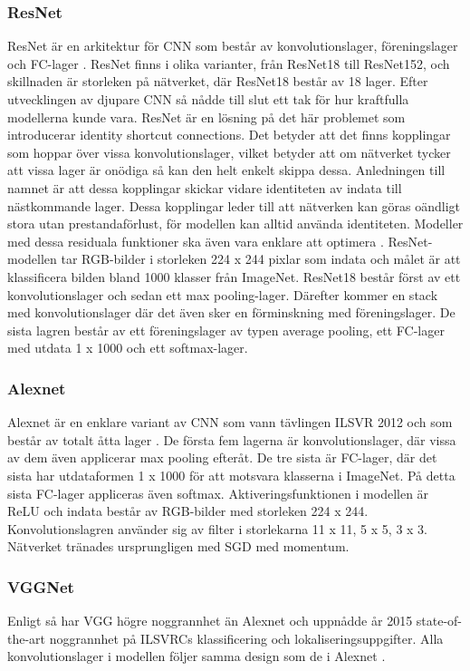 \documentclass[]{kththesis}
\begin{document}
\subsubsection{ResNet}
ResNet är en arkitektur för CNN som består av konvolutionslager, förenings\-lag\-er och FC-lager \parencite{he2016deep}. ResNet finns i olika varianter, från ResNet18 till ResNet152, och skillnaden är storleken på nätverket, där ResNet18 består av 18 lager. Efter utvecklingen av djupare CNN så nådde till slut ett tak för hur kraftfulla modellerna kunde vara. ResNet är en lösning på det här problemet som introducerar identity shortcut connections. Det betyder att det finns kopplingar som hoppar över vissa konvolutionslager, vilket betyder att om nätverket tycker att vissa lager är onödiga så kan den helt enkelt skippa dessa. Anledningen till namnet är att dessa kopplingar skickar vidare identiteten av indata till nästkommande lager. Dessa kopplingar leder till att nätverken kan göras oändligt stora utan prestandaförlust, för modellen kan alltid använda identiteten. Modeller med dessa residuala funktioner ska även vara enklare att optimera \parencite{he2016deep}. ResNet-modellen tar RGB-bilder i storleken 224 x 244 pixlar som indata och målet är att klassificera bilden bland 1000 klasser från ImageNet. ResNet18 består först av ett konvolutionslager och sedan ett max pooling-lager. Därefter kommer en stack med konvolutionslager där det även sker en förminskning med föreningslager. De sista lagren består av ett föreningslager av typen average pooling, ett FC-lager med utdata 1 x 1000 och ett softmax-lager.

\subsubsection{Alexnet}
Alexnet är en enklare variant av CNN som vann tävlingen ILSVR 2012 och som består av totalt åtta lager \parencite{krizhevsky2012imagenet}. De första fem lagerna är konvolutionslager, där vissa av dem även applicerar max pooling efteråt. De tre sista är FC-lager, där det sista har utdataformen 1 x 1000 för att motsvara klasserna i ImageNet. På detta sista FC-lager appliceras även softmax. Aktiveringsfunktionen i modellen är ReLU och indata består av RGB-bilder med storleken 224 x 244. Konvolutionslagren använder sig av filter i storlekarna 11 x 11, 5 x 5, 3 x 3. Nätverket tränades ursprungligen med SGD med momentum.

\subsubsection{VGGNet}
Enligt \cite{simonyan2014very} så har VGG högre noggrannhet än Alexnet och uppnådde år 2015 state-of-the-art noggrannhet på ILSVRCs klassificering och lokal\-isering\-supp\-gift\-er. Alla konvolutionslager i modellen följer samma design som de i Alexnet \parencite{simonyan2014very}. 
\end{document}
